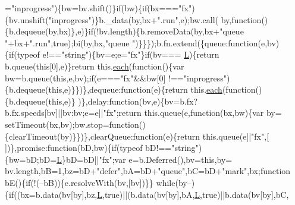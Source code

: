 \begin{DoxyCode}
      =\textcolor{stringliteral}{"inprogress"})\{bw=bv.shift()\}\textcolor{keywordflow}{if}(bw)\{\textcolor{keywordflow}{if}(bx===\textcolor{stringliteral}{"fx"})\{bv.unshift(\textcolor{stringliteral}{"inprogress"})\}b.\_data(by,bx+\textcolor{stringliteral}{".run"},e);bw.call(
      by,\textcolor{keyword}{function}()\{b.dequeue(by,bx)\},e)\}\textcolor{keywordflow}{if}(!bv.length)\{b.removeData(by,bx+\textcolor{stringliteral}{"queue "}+bx+\textcolor{stringliteral}{".run"},\textcolor{keyword}{true});bi(by,bx,\textcolor{stringliteral}{"queue
      "})\}\}\});b.fn.extend(\{queue:\textcolor{keyword}{function}(e,bv)\{\textcolor{keywordflow}{if}(typeof e!==\textcolor{stringliteral}{"string"})\{bv=e;e=\textcolor{stringliteral}{"fx"}\}\textcolor{keywordflow}{if}(bv===
      \hyperlink{jquery_8js_a38ee4c0b5f4fe2a18d0c783af540d253}{L})\{\textcolor{keywordflow}{return} b.queue(\textcolor{keyword}{this}[0],e)\}\textcolor{keywordflow}{return} this.\hyperlink{jquery_8js_a871ff39db627c54c710a3e9909b8234c}{each}(\textcolor{keyword}{function}()\{var bw=b.queue(\textcolor{keyword}{this},e,bv);\textcolor{keywordflow}{if}(e===\textcolor{stringliteral}{"fx"}&&bw[0]
      !==\textcolor{stringliteral}{"inprogress"})\{b.dequeue(\textcolor{keyword}{this},e)\}\})\},dequeue:\textcolor{keyword}{function}(e)\{\textcolor{keywordflow}{return} this.\hyperlink{jquery_8js_a871ff39db627c54c710a3e9909b8234c}{each}(\textcolor{keyword}{function}()\{b.dequeue(\textcolor{keyword}{this},e)\}
      )\},delay:\textcolor{keyword}{function}(bv,e)\{bv=b.fx?b.fx.speeds[bv]||bv:bv;e=e||\textcolor{stringliteral}{"fx"};\textcolor{keywordflow}{return} this.queue(e,\textcolor{keyword}{function}(bx,bw)\{var by=
      setTimeout(bx,bv);bw.stop=\textcolor{keyword}{function}()\{clearTimeout(by)\}\})\},clearQueue:\textcolor{keyword}{function}(e)\{\textcolor{keywordflow}{return} this.queue(e||\textcolor{stringliteral}{"fx"},[
      ])\},promise:\textcolor{keyword}{function}(bD,bw)\{\textcolor{keywordflow}{if}(typeof bD!==\textcolor{stringliteral}{"string"})\{bw=bD;bD=\hyperlink{jquery_8js_a38ee4c0b5f4fe2a18d0c783af540d253}{L}\}bD=bD||\textcolor{stringliteral}{"fx"};var e=b.Deferred(),bv=\textcolor{keyword}{this},by=
      bv.length,bB=1,bz=bD+\textcolor{stringliteral}{"defer"},bA=bD+\textcolor{stringliteral}{"queue"},bC=bD+\textcolor{stringliteral}{"mark"},bx;\textcolor{keyword}{function} bE()\{\textcolor{keywordflow}{if}(!(--bB))\{e.resolveWith(bv,[bv])\}\}\textcolor{keywordflow}{
      while}(by--)\{\textcolor{keywordflow}{if}((bx=b.data(bv[by],bz,\hyperlink{jquery_8js_a38ee4c0b5f4fe2a18d0c783af540d253}{L},\textcolor{keyword}{true})||(b.data(bv[by],bA,\hyperlink{jquery_8js_a38ee4c0b5f4fe2a18d0c783af540d253}{L},\textcolor{keyword}{true})||b.data(bv[by],bC,

\end{DoxyCode}
